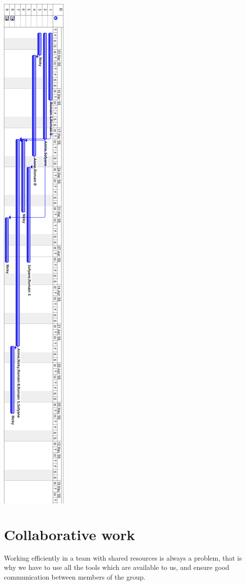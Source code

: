 \documentclass[a4paper,12pt]{article}
\begin{document}
\begin{center}
\includegraphics[scale=0.40]{gantt.png}
\end{center}
\newpage
\section{Collaborative work}
Working efficiently in a team with shared resources is always a problem, that is why we have to use all the tools which are available to us, and ensure good communication between members of the group.
\end{document}
